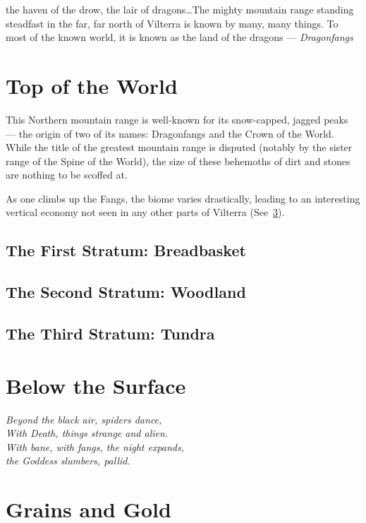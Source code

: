 \documentclass[../main.tex]{subfiles}
\begin{document}
 the haven of the drow,
the lair of dragons\ldots The mighty mountain range standing steadfast in the far,
far north of Vilterra is known by many, many things. To
most of the known world, it is known as the land of the
dragons --- \emph{Dragonfangs}

\section{Top of the World}
This Northern mountain range is well-known for its snow-capped, jagged peaks ---
the origin of two of its names: Dragonfangs and the Crown of the World.
While the title of the greatest mountain range is disputed (notably by the
sister range of the Spine of the World), the size of these behemoths of
dirt and stones are nothing to be scoffed at.

As one climbs up the Fangs, the biome varies drastically, leading to an interesting
vertical economy not seen in any other parts of Vilterra
(See~\ref{sec:grainsandgold}).

\subsection{The First Stratum: Breadbasket} %

\subsection{The Second Stratum: Woodland}

\subsection{The Third Stratum: Tundra}

\section{Below the Surface}
\emph{Beyond the black air, spiders dance,\\
With Death, things strange and alien.\\
With bane, with fangs, the night expands,\\
the Goddess slumbers, pallid.}

\section{Grains and Gold}\label{sec:grainsandgold}
\end{document}
